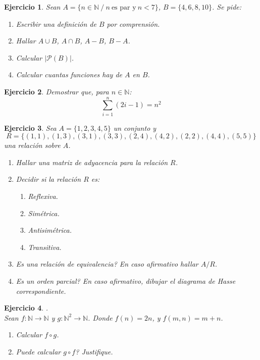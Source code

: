 \documentclass[12pt,a4paper]{article}
\newtheorem {Ejercicio}{Ejercicio}
\newenvironment{ejercicio}{\begin{Ejercicio} \rm}{\rm\end{Ejercicio}}
\begin{document}
\begin{ejercicio}
  Sean $A = \{ n \in \mathbb{N} \:/\:  n\:\mbox{es par y}\: n<7\}$,
  $B=\{4,6,8,10\}$. Se pide:
  \begin{enumerate}
  \item Escribir una definici\'on de $B$ por comprensi\'on.
  \item Hallar $A\cup B$, $A\cap B$, $A-B$, $B-A$.
  \item Calcular $|\mathcal{P}(B)|$.
  \item Calcular cuantas funciones hay de $A$ en $B$.
  \end{enumerate}
\end{ejercicio}

\begin{ejercicio}
  Demostrar que, para $n\in\mathbb{N}$:
  $$\sum_{i=1}^{n}{(2i-1)} = n^2$$
\end{ejercicio}

\begin{ejercicio}
  Sea $A=\{1,2,3,4,5\}$ un conjunto y
  $$R = \{(1,1),(1,3),(3,1),(3,3),(2,4),(4,2),(2,2),(4,4),(5,5)\}$$
  una relaci\'on sobre $A$.
  \begin{enumerate}
  \item Hallar una matriz de adyacencia para la relaci\'on $R$.
  \item Decidir si la relaci\'on $R$ es:
    \begin{enumerate}
    \item Reflexiva.
    \item Sim\'etrica.
    \item Antisim\'etrica.
    \item Transitiva.
    \end{enumerate}
  \item
    Es una relaci\'on de equivalencia? En caso afirmativo hallar
    $A/R$.
  \item
    Es un orden parcial? En caso afirmativo,
    dibujar el diagrama de Hasse correspondiente.
  \end{enumerate}
\end{ejercicio}



\begin{ejercicio}.\\
  Sean $f:\mathbb{N}\rightarrow\mathbb{N}$ y
  $g:\mathbb{N}^2\rightarrow\mathbb{N}$.
  Donde $f(n)=2n$, y $f(m,n)=m+n$.
  \begin{enumerate}
  \item
    Calcular $f \circ g$.
  \item
    Puede calcular $g \circ f$? Justifique.
  \end{enumerate}

\end{ejercicio}
\end{document}
